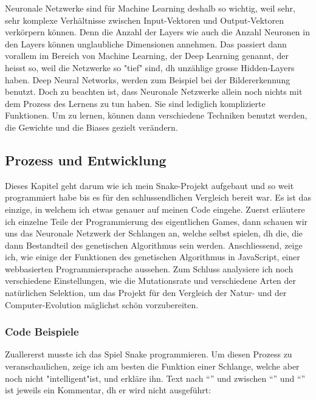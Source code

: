 \documentclass[10pt,a4paper,ngerman,english]{article}
\begin{document}
Neuronale Netzwerke sind für Machine Learning deshalb so wichtig, weil sehr, sehr komplexe Verhältnisse zwischen Input-Vektoren und Output-Vektoren verkörpern können. Denn die Anzahl der Layers wie auch die Anzahl Neuronen in den Layers können unglaubliche Dimensionen annehmen. Das passiert dann vorallem im Bereich von Machine Learning, der Deep Learning genannt, der heisst so, weil die Netzwerke so "tief" sind, dh unzählige grosse Hidden-Layers haben. Deep Neural Networks, werden zum Beispiel bei der Bildererkennung benutzt. Doch zu beachten ist, dass Neuronale Netzwerke allein noch nichts mit dem Prozess des Lernens zu tun haben. Sie sind lediglich komplizierte Funktionen. Um zu lernen, können dann verschiedene Techniken benutzt werden, die Gewichte und die Biases gezielt verändern.

\subsection{Prozess und Entwicklung}

Dieses Kapitel geht darum wie ich mein Snake-Projekt aufgebaut und so weit programmiert habe bis es für den schlussendlichen Vergleich bereit war. Es ist das einzige, in welchem ich etwas genauer auf meinen Code eingehe. Zuerst erläutere ich einzelne Teile der Programmierung des eigentlichen Games, dann schauen wir uns das Neuronale Netzwerk der Schlangen an, welche selbst spielen, dh die, die dann Bestandteil des genetischen Algorithmus sein werden. Anschliessend, zeige ich, wie einige der Funktionen des genetischen Algorithmus in JavaScript, einer webbasierten Programmiersprache aussehen. Zum Schluss analysiere ich noch verschiedene Einstellungen, wie die Mutationsrate und verschiedene Arten der natürlichen Selektion, um das Projekt für den Vergleich der Natur- und der Computer-Evolution mäglichst schön vorzubereiten.

\subsubsection{Code Beispiele}
Zuallererst musste ich das Spiel Snake programmieren. Um diesen Prozess zu veranschaulichen, zeige ich am besten die  Funktion einer Schlange, welche aber noch nicht "intelligent"ist, und erkläre ihn. Text nach \enquote{\textCode{//}} und zwischen \enquote{\textCode{/*}} und \enquote{\textCode{*/}} ist jeweils ein Kommentar, dh er wird nicht ausgeführt:
\end{document}
